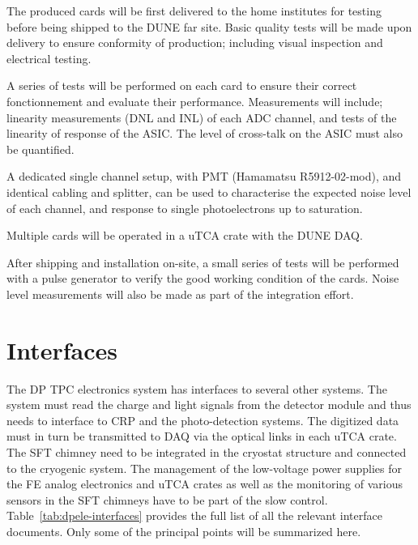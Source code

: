 The produced cards will be first delivered to the home institutes for testing before being shipped to the DUNE far site.  Basic quality tests will be made upon delivery to ensure conformity of production; including visual inspection and electrical testing.

A series of tests will be performed on each card to ensure their correct fonctionnement and evaluate their performance. Measurements will include; linearity measurements (DNL and INL) of each ADC channel, and tests of the linearity of response of the ASIC. The level of cross-talk on the ASIC must also be quantified.

A dedicated single channel setup, with PMT (Hamamatsu R5912-02-mod), and identical cabling and splitter, can be used to characterise the expected noise level of each channel, and response to single photoelectrons up to saturation. 

Multiple cards will be operated in a uTCA crate with the DUNE DAQ.

After shipping and installation on-site, a small series of tests will be performed with a pulse generator to verify the good working condition of the cards. Noise level measurements will also be made as part of the integration effort.




\section{Interfaces}
\label{sec:fddp-tpc-elec-intfc}

The DP TPC electronics system has interfaces to several other systems. The system must read the charge and light signals from the detector module and thus needs to interface to CRP and the photo-detection systems.  The digitized data must in turn be transmitted to DAQ via the optical links in each uTCA crate. The SFT chimney need to be integrated in the cryostat structure and connected to the cryogenic system. The management of the low-voltage power supplies for the FE analog electronics and uTCA crates as well as the monitoring of various sensors in the SFT chimneys have to be part of the slow control. 
Table~\ref{tab:dpele-interfaces} provides the full list of all the relevant interface documents. Only some of the principal points will be summarized here.

